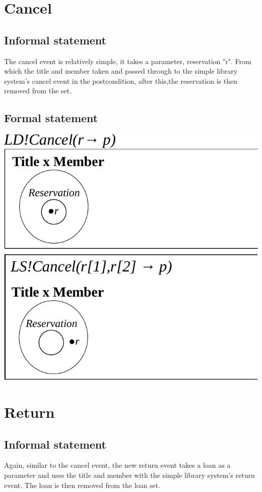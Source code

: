 \documentclass[]{report}
\begin{document}
\section{Cancel}
\subsection{Informal statement}
The cancel event is relatively simple, it takes a parameter, reservation "r". From which the title and member taken and passed through to the simple library system's cancel event in the postcondition, after this,the reservation is then removed from the set.
\subsection{Formal statement}
\begin{center}
	\includegraphics{cancel.pdf}
\end{center}
\newpage
\section{Return}
\subsection{Informal statement}
Again, similar to the cancel event, the new return event takes a loan as a parameter and uses the title and member with the simple library system's return event. The loan is then removed from the loan set.
\end{document}
